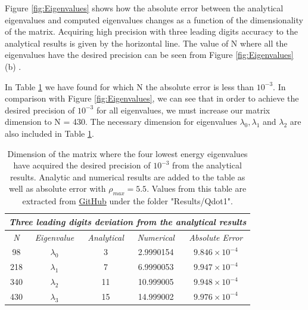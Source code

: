 \documentclass[twoside,onecolumn]{article}
\begin{document}
Figure \ref{fig:Eigenvalues} shows how the absolute error between the analytical eigenvalues and computed eigenvalues changes as a function of the dimensionality of the matrix. Acquiring high precision with three leading digits accuracy to the analytical results is given by the horizontal line. The value of N where all the eigenvalues have the desired precision can be seen from Figure \ref{fig:Eigenvalues} (b) .

\bigskip
In Table \ref{tab:qdot1} we have found for which N the absolute error is less than $10^{-3}$. In comparison with Figure \ref{fig:Eigenvalues}, we can see that in order to achieve the desired precision of $10^{-3}$ for all eigenvalues, we must increase our matrix dimension to N = 430. The necessary dimension for eigenvalues $\lambda_0,\lambda_1$ and $\lambda_2$ are also included in Table \ref{tab:qdot1}.

\begin{table}[H]
\centering
\caption{Dimension of the matrix where the four lowest energy eigenvalues have acquired the desired precision of $10^{-3}$ from the analytical results. Analytic and numerical results are added to the table as well as absolute error with $\rho_{max} = 5.5$. Values from this table are extracted from \textcolor{red}{\href{https://github.com/patrykpk/FYS4150/tree/master/Project_2}{GitHub}} under the folder "Results/Qdot1".}
\label{tab:qdot1}
\begin{tabular}{|c|c|c|c|c|}
\hline
\multicolumn{5}{|c|}{\textit{\textbf{Three leading digits deviation from the analytical results}}}    \\ \hline
\textit{N} & \textit{Eigenvalue} & \textit{Analytical} & \textit{Numerical} & \textit{Absolute Error} \\ \hline
    98     &        $\lambda_0$         &   3                   &   2.9990154                 &        $9.846\times10^{-4}$                 \\ \hline
    218     &        $\lambda_1$         &   7                   &     6.9990053               &      $9.947\times 10^{-4}$                   \\ \hline
    340     &        $\lambda_2$         &  11                   &     10.999005               &      $9.948\times 10^{-4}$                   \\ \hline
    430     &        $\lambda_3$         &  15                   &    14.999002                &       $9.976\times 10^{-4}$                  \\ \hline
\end{tabular}
\end{table}
\end{document}
